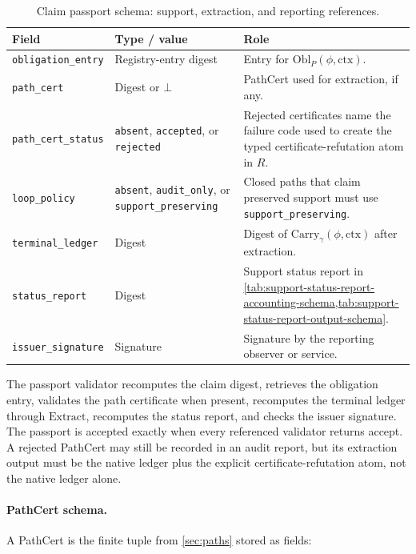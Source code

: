 \documentclass[11pt,twoside]{article}
\newcommand{\OGSchemaTableFont}{\footnotesize}
\newcommand{\OGTableHeaderRow}{\rowcolor{tableheaderbg}}
\newcommand{\TableHeaderRow}{\OGTableHeaderRow}
\newenvironment{OGTable}[2][ht]{%
  \begin{table}[#1]
  \centering
  #2
  \renewcommand{\arraystretch}{1.08}%
  \rowcolors{2}{tablerowbg}{white}%
}{%
  \rowcolors{2}{}{}%
  \end{table}%
}
\theoremstyle{definition}
\newcommand{\Obl}{\mathrm{Obl}}
\newcommand{\Carry}{\mathrm{Carry}}
\newcommand{\Extract}{\mathrm{Extract}}
\newcommand{\ctx}{\mathrm{ctx}}
\begin{document}
\begin{OGTable}{\OGSchemaTableFont}
\begin{tabularx}{\textwidth}{>{\raggedright\arraybackslash}p{}>{\raggedright\arraybackslash}p{}>{\raggedright\arraybackslash}X}
\toprule
\TableHeaderRow \textbf{Field} & \textbf{Type / value} & \textbf{Role} \\
\midrule
\texttt{obligation\_entry} & Registry-entry digest & Entry for $\Obl_P(\phi,\ctx)$. \\
\texttt{path\_cert} & Digest or $\bot$ & PathCert used for extraction, if any. \\
\texttt{path\_cert\_status} & \texttt{absent}, \texttt{accepted}, or \texttt{rejected} & Rejected certificates name the failure code used to create the typed certificate-refutation atom in $R$. \\
\texttt{loop\_policy} & \texttt{absent}, \texttt{audit\_only}, or \texttt{support\_preserving} & Closed paths that claim preserved support must use \texttt{support\_preserving}. \\
\texttt{terminal\_ledger} & Digest & Digest of $\Carry_\gamma(\phi,\ctx)$ after extraction. \\
\texttt{status\_report} & Digest & Support status report in \cref{tab:support-status-report-accounting-schema,tab:support-status-report-output-schema}. \\
\texttt{issuer\_signature} & Signature & Signature by the reporting observer or service. \\
\bottomrule
\end{tabularx}
\caption{Claim passport schema: support, extraction, and reporting references.}
\label{tab:claim-passport-support-schema}
\end{OGTable}
\FloatBarrier

The passport validator recomputes the claim digest, retrieves the obligation
entry, validates the path certificate when present, recomputes the terminal
ledger through $\Extract$, recomputes the status report, and checks the issuer
signature. The passport is accepted exactly when every referenced validator
returns accept. A rejected PathCert may still be recorded in an audit report,
but its extraction output must be the native ledger plus the explicit
certificate-refutation atom, not the native ledger alone.

\paragraph{PathCert schema.}
A PathCert is the finite tuple from \cref{sec:paths} stored as fields:
\end{document}
